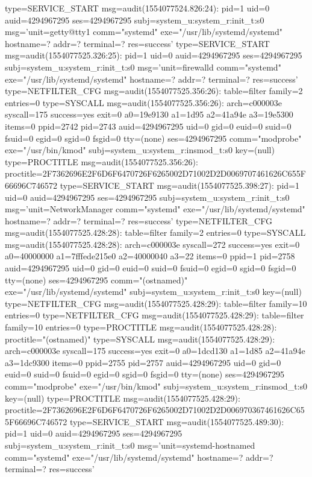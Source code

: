 \documentclass[]{report}
\newenvironment{Shaded}{}{}
\newcommand{\NormalTok}[1]{#1}
\begin{document}
\begin{Shaded}
\begin{Highlighting}[]
\NormalTok{type=SERVICE_START msg=audit(1554077524.826:24): pid=1 uid=0 auid=4294967295 ses=4294967295 subj=system_u:system_r:init_t:s0 msg='unit=getty@tty1 comm="systemd" exe="/usr/lib/systemd/systemd" hostname=? addr=? terminal=? res=success'}
\NormalTok{type=SERVICE_START msg=audit(1554077525.326:25): pid=1 uid=0 auid=4294967295 ses=4294967295 subj=system_u:system_r:init_t:s0 msg='unit=firewalld comm="systemd" exe="/usr/lib/systemd/systemd" hostname=? addr=? terminal=? res=success'}
\NormalTok{type=NETFILTER_CFG msg=audit(1554077525.356:26): table=filter family=2 entries=0}
\NormalTok{type=SYSCALL msg=audit(1554077525.356:26): arch=c000003e syscall=175 success=yes exit=0 a0=19e9130 a1=1d95 a2=41a94e a3=19e5300 items=0 ppid=2742 pid=2743 auid=4294967295 uid=0 gid=0 euid=0 suid=0 fsuid=0 egid=0 sgid=0 fsgid=0 tty=(none) ses=4294967295 comm="modprobe" exe="/usr/bin/kmod" subj=system_u:system_r:insmod_t:s0 key=(null)}
\NormalTok{type=PROCTITLE msg=audit(1554077525.356:26): proctitle=2F7362696E2F6D6F6470726F6265002D71002D2D0069707461626C655F66696C746572}
\NormalTok{type=SERVICE_START msg=audit(1554077525.398:27): pid=1 uid=0 auid=4294967295 ses=4294967295 subj=system_u:system_r:init_t:s0 msg='unit=NetworkManager comm="systemd" exe="/usr/lib/systemd/systemd" hostname=? addr=? terminal=? res=success'}
\NormalTok{type=NETFILTER_CFG msg=audit(1554077525.428:28): table=filter family=2 entries=0}
\NormalTok{type=SYSCALL msg=audit(1554077525.428:28): arch=c000003e syscall=272 success=yes exit=0 a0=40000000 a1=7fffede215e0 a2=40000040 a3=22 items=0 ppid=1 pid=2758 auid=4294967295 uid=0 gid=0 euid=0 suid=0 fsuid=0 egid=0 sgid=0 fsgid=0 tty=(none) ses=4294967295 comm="(ostnamed)" exe="/usr/lib/systemd/systemd" subj=system_u:system_r:init_t:s0 key=(null)}
\NormalTok{type=NETFILTER_CFG msg=audit(1554077525.428:29): table=filter family=10 entries=0}
\NormalTok{type=NETFILTER_CFG msg=audit(1554077525.428:29): table=filter family=10 entries=0}
\NormalTok{type=PROCTITLE msg=audit(1554077525.428:28): proctitle="(ostnamed)"}
\NormalTok{type=SYSCALL msg=audit(1554077525.428:29): arch=c000003e syscall=175 success=yes exit=0 a0=1dcd130 a1=1d85 a2=41a94e a3=1dc9300 items=0 ppid=2755 pid=2757 auid=4294967295 uid=0 gid=0 euid=0 suid=0 fsuid=0 egid=0 sgid=0 fsgid=0 tty=(none) ses=4294967295 comm="modprobe" exe="/usr/bin/kmod" subj=system_u:system_r:insmod_t:s0 key=(null)}
\NormalTok{type=PROCTITLE msg=audit(1554077525.428:29): proctitle=2F7362696E2F6D6F6470726F6265002D71002D2D006970367461626C655F66696C746572}
\NormalTok{type=SERVICE_START msg=audit(1554077525.489:30): pid=1 uid=0 auid=4294967295 ses=4294967295 subj=system_u:system_r:init_t:s0 msg='unit=systemd-hostnamed comm="systemd" exe="/usr/lib/systemd/systemd" hostname=? addr=? terminal=? res=success'}

\end{Highlighting}
\end{Shaded}
\end{document}
